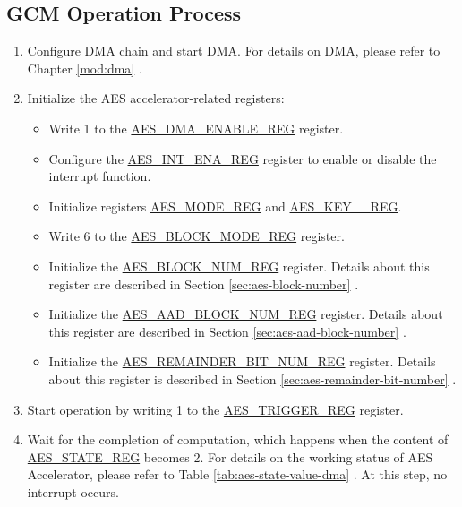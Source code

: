 \documentclass[main\_\_EN.tex]{subfiles}
\begin{document}
\subsection{GCM Operation Process}

\begin{enumerate}
    \item Configure DMA chain and start DMA. For details on DMA, please refer to Chapter \ref{mod:dma} \textit{}.
    \item Initialize the AES accelerator-related registers:
    \begin{itemize}
        \item Write 1 to the \hyperref[regdesc:AESDMAENABLEREG]{AES\_DMA\_ENABLE\_REG} register.
        \item Configure the \hyperref[regdesc:AESINTENAREG]{AES\_INT\_ENA\_REG} register to enable or disable the interrupt function.
        \item Initialize registers \hyperref[regdesc:AESMODEREG]{AES\_MODE\_REG} and \hyperref[regdesc:AESKEYnREG]{AES\_KEY\_\_REG}.
        \item Write 6 to the \hyperref[regdesc:AESBLOCKMODEREG]{AES\_BLOCK\_MODE\_REG} register.
        \item Initialize the \hyperref[regdesc:AESBLOCKNUMREG]{AES\_BLOCK\_NUM\_REG} register. Details about this register are described in Section \ref{sec:aes-block-number} \textit{}.
        \item Initialize the \hyperref[regdesc:AESAADBLOCKNUMREG]{AES\_AAD\_BLOCK\_NUM\_REG} register. Details about this register are described in Section \ref{sec:aes-aad-block-number} \textit{}.
        \item Initialize the \hyperref[regdesc:AESREMAINDERBITNUMREG]{AES\_REMAINDER\_BIT\_NUM\_REG} register. Details about this register is described in Section \ref{sec:aes-remainder-bit-number} \textit{}.
    \end{itemize}
    \item Start operation by writing 1 to the \hyperref[regdesc:AESTRIGGERREG]{AES\_TRIGGER\_REG} register.
    \item Wait for the completion of computation, which happens when the content of \hyperref[regdesc:AESSTATEREG]{AES\_STATE\_REG} becomes 2. For details on the working status of AES Accelerator, please refer to Table \ref{tab:aes-state-value-dma} \textit{}. At this step, no interrupt occurs.

\end{enumerate}
\end{document}
